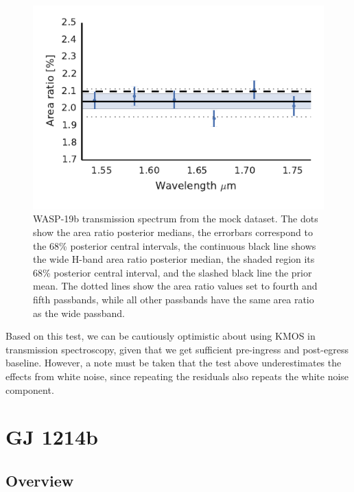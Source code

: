 \documentclass[useAMS,usenatbib]{mn2e}
\begin{document}
\begin{figure}
 \centering
 \includegraphics[width=\columnwidth]{wasp_19_h_fake_transmission_spectrum_a.pdf}
 \caption{WASP-19b transmission spectrum from the mock dataset. The dots show the area ratio posterior medians, the 
  errorbars correspond to the 68\% posterior central intervals, the continuous black line shows the wide H-band area 
  ratio posterior median, the shaded region its 68\% posterior central interval, and the slashed black line the prior 
  mean. The dotted lines show the area ratio values set to fourth and fifth passbands, while all other passbands have 
  the same area ratio as the wide passband.}
 \label{fig:wasp_19b_h_mock_transmission_spectrum}
\end{figure}

Based on this test, we can be cautiously optimistic about using KMOS in transmission spectroscopy, given that we get 
sufficient pre-ingress and post-egress baseline. However, a note must be taken that the test above underestimates the 
effects from white noise, since repeating the residuals also repeats the white noise component.

\section{GJ 1214b}
\label{sec:gj1214b}
\subsection{Overview}
\end{document}
